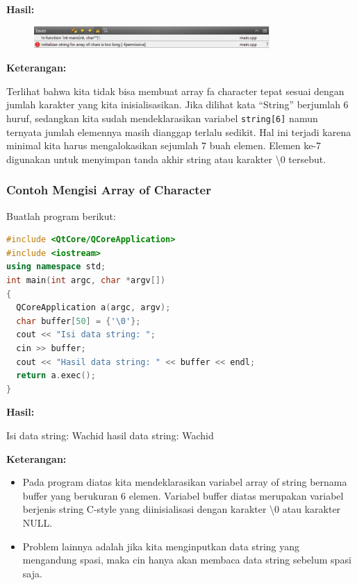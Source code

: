 \textbf{Hasil:}

\begin{figure}[htbp]
\centering
\includegraphics[width=0.8\textwidth]{../manuscript/images/capture2-7.PNG}

\end{figure}

\textbf{Keterangan:}

Terlihat bahwa kita tidak bisa membuat array fa character tepat sesuai
dengan jumlah karakter yang kita inisialisasikan. Jika dilihat kata
``String'' berjumlah 6 huruf, sedangkan kita sudah mendeklarasikan
variabel \texttt{string{[}6{]}} namun ternyata jumlah elemennya masih
dianggap terlalu sedikit. Hal ini terjadi karena minimal kita harus
mengalokasikan sejumlah 7 buah elemen. Elemen ke-7 digunakan untuk
menyimpan tanda akhir string atau karakter \textbackslash0 tersebut.

\subsubsection*{Contoh  Mengisi Array of Character}

Buatlah program berikut:

\begin{lstlisting}[language=c++, caption=Mengisi Array of Character, label=contoh3-17]
#include <QtCore/QCoreApplication>
#include <iostream>
using namespace std;
int main(int argc, char *argv[])
{
  QCoreApplication a(argc, argv);
  char buffer[50] = {'\0'};
  cout << "Isi data string: ";
  cin >> buffer;
  cout << "Hasil data string: " << buffer << endl;
  return a.exec();
}
\end{lstlisting}

\textbf{Hasil:}
\begin{lcverbatim}
Isi data string: Wachid
hasil data string: Wachid
\end{lcverbatim}


\textbf{Keterangan:}

\begin{itemize}

\item
  Pada program diatas kita mendeklarasikan variabel array of string
  bernama buffer yang berukuran 6 elemen. Variabel buffer diatas
  merupakan variabel berjenis string C-style yang diinisialisasi dengan
  karakter \textbackslash{0} atau karakter NULL.
\item
  Problem lainnya adalah jika kita menginputkan data string yang
  mengandung spasi, maka cin hanya akan membaca data string sebelum
  spasi saja.
\end{itemize}

